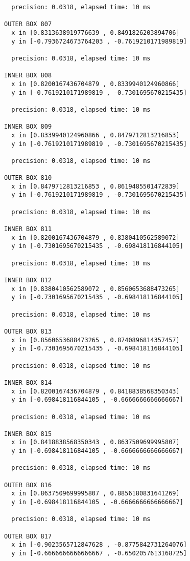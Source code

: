 \begin{verbatim}
  precision: 0.0318, elapsed time: 10 ms

OUTER BOX 807
  x in [0.8313638919776639 , 0.8491826203894706]
  y in [-0.7936724673764203 , -0.7619210171989819]

  precision: 0.0318, elapsed time: 10 ms

INNER BOX 808
  x in [0.8200167436704879 , 0.8339940124960866]
  y in [-0.7619210171989819 , -0.7301695670215435]

  precision: 0.0318, elapsed time: 10 ms

INNER BOX 809
  x in [0.8339940124960866 , 0.8479712813216853]
  y in [-0.7619210171989819 , -0.7301695670215435]

  precision: 0.0318, elapsed time: 10 ms

OUTER BOX 810
  x in [0.8479712813216853 , 0.8619485501472839]
  y in [-0.7619210171989819 , -0.7301695670215435]

  precision: 0.0318, elapsed time: 10 ms

INNER BOX 811
  x in [0.8200167436704879 , 0.8380410562589072]
  y in [-0.7301695670215435 , -0.698418116844105]

  precision: 0.0318, elapsed time: 10 ms

INNER BOX 812
  x in [0.8380410562589072 , 0.8560653688473265]
  y in [-0.7301695670215435 , -0.698418116844105]

  precision: 0.0318, elapsed time: 10 ms

OUTER BOX 813
  x in [0.8560653688473265 , 0.8740896814357457]
  y in [-0.7301695670215435 , -0.698418116844105]

  precision: 0.0318, elapsed time: 10 ms

INNER BOX 814
  x in [0.8200167436704879 , 0.8418838568350343]
  y in [-0.698418116844105 , -0.6666666666666667]

  precision: 0.0318, elapsed time: 10 ms

INNER BOX 815
  x in [0.8418838568350343 , 0.8637509699995807]
  y in [-0.698418116844105 , -0.6666666666666667]

  precision: 0.0318, elapsed time: 10 ms

OUTER BOX 816
  x in [0.8637509699995807 , 0.8856180831641269]
  y in [-0.698418116844105 , -0.6666666666666667]

  precision: 0.0318, elapsed time: 10 ms

OUTER BOX 817
  x in [-0.9023565712847628 , -0.8775842731264076]
  y in [-0.6666666666666667 , -0.6502057613168725]


\end{verbatim}
